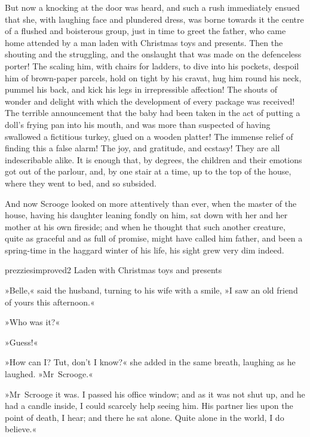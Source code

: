 But now a knocking at the door was heard, and such a rush immediately ensued that she, with laughing face and plundered dress, was borne towards it the centre of a flushed and boisterous group, just in time to greet the father, who came home attended by a man laden with Christmas toys and presents. Then the shouting and the struggling, and the onslaught that was made on the defenceless porter! The scaling him, with chairs for ladders, to dive into his pockets, despoil him of brown-paper parcels, hold on tight by his cravat, hug him round his neck, pummel his back, and kick his legs in irrepressible affection! The shouts of wonder and delight with which the development of every package was received! The terrible announcement that the baby had been taken in the act of putting a doll's frying pan into his mouth, and was more than suspected of having swallowed a fictitious turkey, glued on a wooden platter! The immense relief of finding this a false alarm! The joy, and gratitude, and ecstasy! They are all indescribable alike. It is enough that, by degrees, the children and their emotions got out of the parlour, and, by one stair at a time, up to the top of the house, where they went to bed, and so subsided.

And now Scrooge looked on more attentively than ever, when the master of the house, having his daughter leaning fondly on him, sat down with her and her mother at his own fireside; and when he thought that such another creature, quite as graceful and as full of promise, might have called him father, and been a spring-time in the haggard winter of his life, his sight grew very dim indeed.

\begin{colorbigpic}
	[\bigpicsize]
	{prezziesimproved2}
	{Laden with Christmas toys and presents}
\end{colorbigpic}


»Belle,« said the husband, turning to his wife with a smile, »I saw an old friend of yours this afternoon.«

»Who was it?«

»Guess!«

»How can I? Tut, don't I know?« she added in the same breath, laughing as he laughed. »Mr~Scrooge.«

»Mr~Scrooge it was. I passed his office window; and as it was not shut up, and he had a candle inside, I could scarcely help seeing him. His partner lies upon the point of death, I hear; and there he sat alone. Quite alone in the world, I do believe.«

